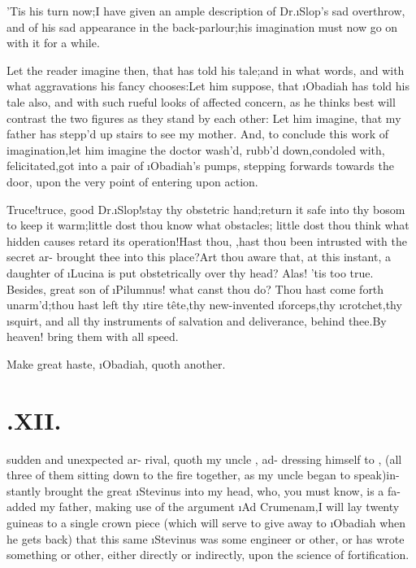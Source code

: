 \documentclass[twoside]{article}
\begin{document}
’Tis his turn now;\tsk I have given an ample description of Dr.\@ \i{Slop}’s sad
overthrow, and of his sad appearance in the back-parlour;\tsk his
imagination must now go on with it for a while.

Let the reader imagine then, that \drslop has told his
tale;\tsk and in what words, and with what aggravations his fancy
chooses:\tsk Let him suppose, that \i{Obadiah} has told his
tale also, and with such rueful looks of affected concern,\break
as he thinks best will contrast the two\break
figures as they stand by each other:\tsk\break
Let him imagine, that my father has\break
stepp’d up stairs to see my mother.\tsk\break 
And, to conclude this work of imagination,\tsk let him
imagine the doctor wash’d,\break
\tsk rubb’d down,\tsk condoled with,\tsk\break
felicitated,\tsk got into a pair of \i{Obadiah}’s\break
pumps, stepping forwards towards the
door, upon the very point of entering\break
upon action.

Truce!\tsk truce, good Dr.\@ \i{Slop!}\tsk stay thy
obstetric hand;\tsk return it safe into thy bosom to keep
it warm;\tsk little dost thou know what obstacles;\tsk
little dost thou think what hidden causes retard its
operation!\tsk Hast thou, \drslop,\tsk hast thou
been intrusted with the secret ar-\break
{} 
brought thee into this place?\tsk Art thou aware
that, at this instant, a daughter of \i{Lucina} is put
obstetrically over thy head?\break
Alas! ’tis too true.\tsk
Besides, great son of \i{Pilumnus!} what canst thou
do?\tsh\break
Thou hast come forth unarm’d;\tsk thou hast left thy
\i{tire tête},\tsk thy new-invented
\i{forceps},\tsk thy \i{crotchet},\tsk thy
\i{squirt}, and all thy instruments of salvation and
deliverance, behind thee.\tsk By heaven!
bring them with all speed.

\tsh Make great haste, \i{Obadiah}, quoth 
another.

\section{\chapstrut{}.\enspace  XII.}

 sudden and unexpected ar-\break
rival, quoth my uncle \toby, ad-\break
dressing himself to \drslop,
(all three of them sitting down to the fire together, as my uncle
\toby began to speak)\tsk in-\break
stantly brought the great \i{Stevinus} into\break
my head, who, you must know, is a fa-
added my father, making use of the ar\-gument \i{Ad
Crumenam},\tsh I will lay\break
twenty guineas to a single crown piece (which will serve to
give away to \i{Obadiah} when he gets back) that this
same \i{Stevinus} was some engineer or other,\tsk\break
or has wrote something or other, either directly or indirectly,
upon the science of\break
fortification.
\end{document}
